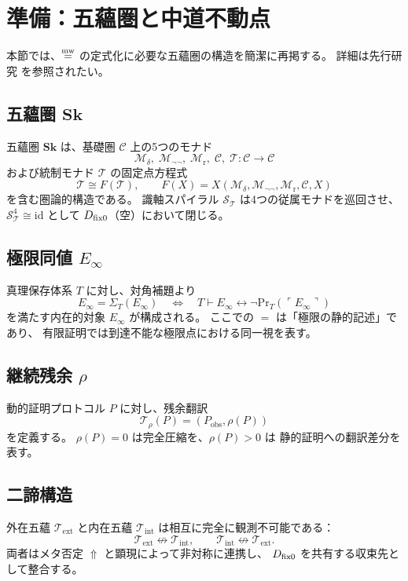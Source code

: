 \documentclass[11pt,a4paper]{article}
\theoremstyle{definition}
\newcommand{\Sk}{\mathbf{Sk}}
\newcommand{\T}{\mathcal{T}}
\newcommand{\TExt}{\T_{\mathrm{ext}}}
\newcommand{\TInt}{\T_{\mathrm{int}}}
\newcommand{\SpiralT}{\mathcal{S}_{\T}}
\newcommand{\SelfRef}{\Sigma}
\newcommand{\Einfty}{E_{\infty}}
\newcommand{\id}{\mathrm{id}}
\renewcommand{\Pr}{\mathrm{Pr}}
\newcommand{\Mdelta}{\mathcal{M}_{\delta}}
\newcommand{\Mneg}{\mathcal{M}_{\neg\neg}}
\newcommand{\Mr}{\mathcal{M}_{\mathrm{r}}}
\newcommand{\Mc}{\mathcal{C}}
\begin{document}
\section{準備：五蘊圏と中道不動点}

本節では、$\mathrel{\overset{\mathrm{mw}}{=}}$ の定式化に必要な五蘊圏の構造を簡潔に再掲する。
詳細は先行研究 \cite{Chiba2026skandha,Chiba2026einfty} を参照されたい。

\subsection{五蘊圏 \texorpdfstring{$\Sk$}{Sk}}

五蘊圏 $\Sk$ は、基礎圏 $\mathcal{C}$ 上の5つのモナド
\[
\Mdelta,\; \Mneg,\; \Mr,\; \Mc,\; \T : \mathcal{C}\to\mathcal{C}
\]
および統制モナド $\T$ の固定点方程式
\[
\T \cong F(\T),\qquad F(X)=X(\Mdelta,\Mneg,\Mr,\Mc,X)
\]
を含む圏論的構造である。
識軸スパイラル $\SpiralT$ は4つの従属モナドを巡回させ、
$\SpiralT^4\cong\id$ として $D_{\mathrm{fix}0}$（空）において閉じる。

\subsection{極限同値 \texorpdfstring{$E_\infty$}{E-infinity}}

真理保存体系 $T$ に対し、対角補題より
\[
\Einfty = \SelfRef_T(\Einfty)
\quad\Longleftrightarrow\quad
T\vdash \Einfty\leftrightarrow\neg\Pr_T(\ulcorner\Einfty\urcorner)
\]
を満たす内在的対象 $\Einfty$ が構成される。
ここでの $=$ は「極限の静的記述」であり、
有限証明では到達不能な極限点における同一視を表す。

\subsection{継続残余 \texorpdfstring{$\rho$}{rho}}

動的証明プロトコル $P$ に対し、残余翻訳
\[
\mathcal{T}_\rho(P)=(P_{\mathrm{obs}},\rho(P))
\]
を定義する。
$\rho(P)=0$ は完全圧縮を、$\rho(P)>0$ は
静的証明への翻訳差分を表す。

\subsection{二諦構造}

外在五蘊 $\TExt$ と内在五蘊 $\TInt$ は相互に完全に観測不可能である：
\[
\TExt\not\leftrightarrow\TInt,\qquad \TInt\not\leftrightarrow\TExt.
\]
両者はメタ否定 $\Uparrow$ と顕現によって非対称に連携し、
$D_{\mathrm{fix}0}$ を共有する収束先として整合する。
\end{document}
